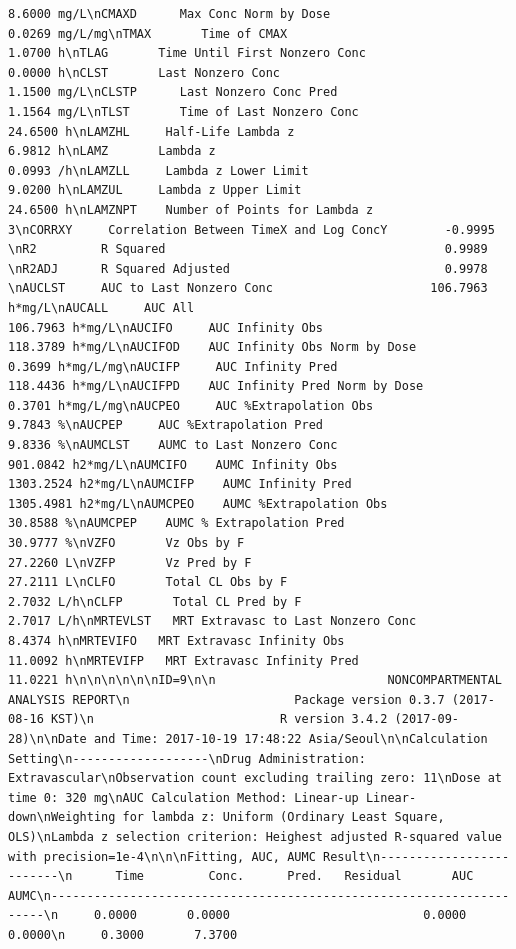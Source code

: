 \documentclass[]{krantz}
\theoremstyle{definition}
\theoremstyle{definition}
\theoremstyle{definition}
\theoremstyle{remark}
\begin{document}
\begin{verbatim}
8.6000 mg/L\nCMAXD      Max Conc Norm by Dose                           0.0269 mg/L/mg\nTMAX       Time of CMAX                                    1.0700 h\nTLAG       Time Until First Nonzero Conc                   0.0000 h\nCLST       Last Nonzero Conc                               1.1500 mg/L\nCLSTP      Last Nonzero Conc Pred                          1.1564 mg/L\nTLST       Time of Last Nonzero Conc                      24.6500 h\nLAMZHL     Half-Life Lambda z                              6.9812 h\nLAMZ       Lambda z                                        0.0993 /h\nLAMZLL     Lambda z Lower Limit                            9.0200 h\nLAMZUL     Lambda z Upper Limit                           24.6500 h\nLAMZNPT    Number of Points for Lambda z                   3\nCORRXY     Correlation Between TimeX and Log ConcY        -0.9995 \nR2         R Squared                                       0.9989 \nR2ADJ      R Squared Adjusted                              0.9978 \nAUCLST     AUC to Last Nonzero Conc                      106.7963 h*mg/L\nAUCALL     AUC All                                       106.7963 h*mg/L\nAUCIFO     AUC Infinity Obs                              118.3789 h*mg/L\nAUCIFOD    AUC Infinity Obs Norm by Dose                   0.3699 h*mg/L/mg\nAUCIFP     AUC Infinity Pred                             118.4436 h*mg/L\nAUCIFPD    AUC Infinity Pred Norm by Dose                  0.3701 h*mg/L/mg\nAUCPEO     AUC %Extrapolation Obs                          9.7843 %\nAUCPEP     AUC %Extrapolation Pred                         9.8336 %\nAUMCLST    AUMC to Last Nonzero Conc                     901.0842 h2*mg/L\nAUMCIFO    AUMC Infinity Obs                            1303.2524 h2*mg/L\nAUMCIFP    AUMC Infinity Pred                           1305.4981 h2*mg/L\nAUMCPEO    AUMC %Extrapolation Obs                        30.8588 %\nAUMCPEP    AUMC % Extrapolation Pred                      30.9777 %\nVZFO       Vz Obs by F                                    27.2260 L\nVZFP       Vz Pred by F                                   27.2111 L\nCLFO       Total CL Obs by F                               2.7032 L/h\nCLFP       Total CL Pred by F                              2.7017 L/h\nMRTEVLST   MRT Extravasc to Last Nonzero Conc              8.4374 h\nMRTEVIFO   MRT Extravasc Infinity Obs                     11.0092 h\nMRTEVIFP   MRT Extravasc Infinity Pred                    11.0221 h\n\n\n\n\n\nID=9\n\n                        NONCOMPARTMENTAL ANALYSIS REPORT\n                       Package version 0.3.7 (2017-08-16 KST)\n                          R version 3.4.2 (2017-09-28)\n\nDate and Time: 2017-10-19 17:48:22 Asia/Seoul\n\nCalculation Setting\n-------------------\nDrug Administration: Extravascular\nObservation count excluding trailing zero: 11\nDose at time 0: 320 mg\nAUC Calculation Method: Linear-up Linear-down\nWeighting for lambda z: Uniform (Ordinary Least Square, OLS)\nLambda z selection criterion: Heighest adjusted R-squared value with precision=1e-4\n\n\nFitting, AUC, AUMC Result\n-------------------------\n      Time         Conc.      Pred.   Residual       AUC       AUMC\n---------------------------------------------------------------------\n     0.0000       0.0000                           0.0000     0.0000\n     0.3000       7.3700                  
\end{verbatim}
\end{document}
